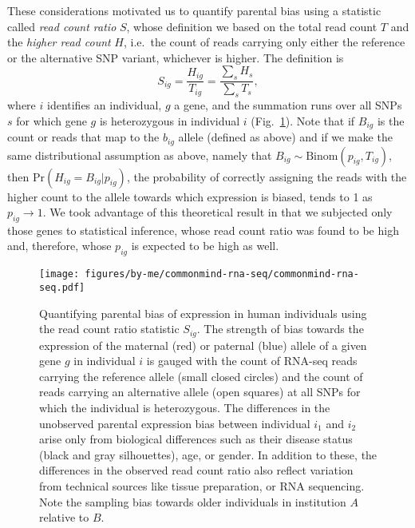 \documentclass[letterpaper]{article}
\begin{document}
These considerations motivated us to quantify parental bias using a statistic called
\emph{read count ratio} \(S\), whose definition we
based on the total read count \(T\) and the \emph{higher read count} \(H\),
i.e.~the count of reads carrying only either the reference or the alternative SNP variant,
whichever is higher.  The
definition is
\begin{equation}
S_{ig} = \frac{H_{ig}}{T_{ig}}= \frac{\sum_s H_s}{\sum_sT_s},
\label{eq:S-definition}
\end{equation}
where \(i\) identifies an individual, \(g\) a gene, and the summation runs
over all SNPs \(s\) for which gene \(g\) is heterozygous in individual \(i\) (Fig.~\ref{fig:study-design}).
Note that if \(B_{ig}\) is the count or reads that map to the \(b_{ig}\) allele
(defined as above) and if we make the same distributional assumption as above, namely that \(B_{ig}\sim
\mathrm{Binom}(p_{ig}, T_{ig})\), then \(\mathrm{Pr}(H_{ig}=B_{ig}|p_{ig})\), the probability of correctly
assigning the reads with the higher count to the allele towards which
expression is biased, tends to 1 as \(p_{ig} \rightarrow 1\).  We took
advantage of this theoretical result in that we subjected only those genes to
statistical inference, whose read count ratio was found to be high and,
therefore, whose \(p_{ig}\) is expected to be high as well.

\begin{figure} \begin{center}
\texttt{[image: figures/by-me/commonmind-rna-seq/commonmind-rna-seq.pdf]}
\end{center} \caption{ Quantifying parental bias of expression in human
individuals using the read count ratio statistic \(S_{ig}\).  The strength of bias towards the
expression of the maternal (red) or paternal (blue) allele of a given gene
\(g\) in
individual \(i\) is gauged with the count of RNA-seq reads carrying the
reference allele (small closed circles) and the count of reads carrying an
alternative allele (open squares) at all SNPs for which the
individual is heterozygous.  The differences in the unobserved parental
expression bias between individual \(i_1\) and \(i_2\) arise only from
biological differences such as their disease status (black and gray
silhouettes), age, or gender.  In addition to these, the differences in the
observed read count ratio also reflect variation from technical sources like
tissue preparation, or RNA sequencing.  Note the sampling bias towards older
individuals in institution \(A\) relative to \(B\). } \label{fig:study-design}
\end{figure}
\end{document}
